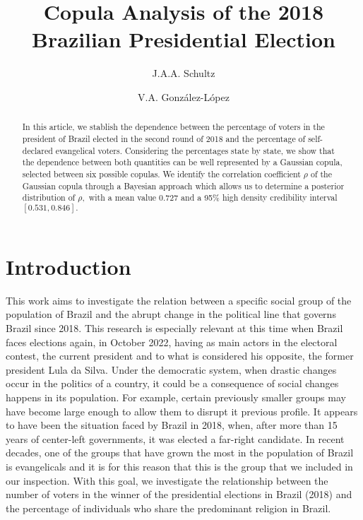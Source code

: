 \documentclass{aip-cp}
\title{Copula Analysis of the 2018 Brazilian Presidential Election}
\author{J.A.A. Schultz} %
\author{V.A. Gonz\'alez-L\'opez} %
\affil{University of Campinas - Department of Statistics. Rua S\'{e}rgio Buarque de Holanda 651. Campinas, S.P. Brazil. CEP:  13083-859.}
\begin{document}
\date{}



\maketitle




\begin{abstract}
In this article, we stablish the dependence between the percentage of voters in the president of Brazil elected in the second round of 2018 and the percentage of self-declared evangelical voters. Considering the percentages state by state, we show that the dependence between both quantities can be well represented by a Gaussian copula, selected between six possible copulas. We identify the correlation coefficient $\rho$ of the Gaussian copula through a Bayesian approach which allows us to determine a posterior distribution of $\rho,$ with a mean value $ 0.727$ and a 95\% high density credibility interval $[0.531, 0.846].$ 

\end{abstract}

\section{Introduction} \label{prelim}
This work aims to investigate the relation between a specific social group of the population of Brazil and the abrupt change in the political line that governs Brazil since 2018. This research is especially relevant at this time when Brazil faces elections again, in October 2022, having as main actors in the electoral contest, the current president and to what is considered his opposite, the former president Lula da Silva.
Under the democratic system, when drastic changes occur in the politics of a country, it could be a consequence of social changes happens in its population. For example, certain previously smaller groups may have become large enough to allow them to disrupt it previous profile. It appears to have been the situation faced by Brazil in 2018, when, after more than 15 years of center-left governments, it was elected a far-right candidate.  In recent decades, one of the groups that have grown the most in the population of Brazil is evangelicals and it is for this reason that this is the group that we included in our inspection. With this goal, we investigate the relationship between the number
of voters in the winner of the presidential elections in Brazil (2018) and the percentage of individuals who share the
predominant religion in Brazil.
\end{document}
